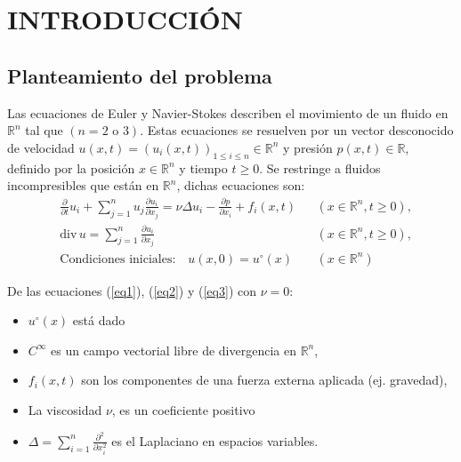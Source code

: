 \chapter{INTRODUCCIÓN}
\setcounter{page}{1}
\section{Planteamiento del problema}
Las ecuaciones de Euler y Navier-Stokes describen el movimiento de un fluido en $\mathbb{R}^n$ tal que $(n=2\text{ o }3)$. Estas ecuaciones se resuelven por un vector desconocido de velocidad $u(x,t)= \left(u_i(x,t)\right)_{1\leq i \leq n}\in \mathbb{R}^n$ y presión $p(x,t)\in \mathbb{R}$, definido por la posición $x\in \mathbb{R}^n$ y tiempo $t\geq 0$. Se restringe a fluidos incompresibles que están en $\mathbb{R}^n$, dichas ecuaciones son:
\begin{align}
    &\frac{\partial}{\partial t} u_i + \sum_{j = 1}^n u_j \frac{\partial u_i}{\partial x_j} = \nu \Delta u_i - \frac{\partial p}{\partial x_i} + f_i(x,t)&& \left(x\in \mathbb{R}^n, t\geq 0\right),\label{eq1}\\
    &\text{div}\, u = \sum_{j = 1}^n \frac{\partial u_i}{\partial x_j} && \left(x\in \mathbb{R}^n, t\geq 0\right),\label{eq2}\\
    &\text{Condiciones iniciales:}\quad u(x,0) = u^{\circ}(x) && \left(x\in \mathbb{R}^n\right)\label{eq3}
\end{align}
\begin{notation}
De las ecuaciones (\ref{eq1}), (\ref{eq2}) y (\ref{eq3}) con $\nu=0$:
    \begin{itemize}
        \item $u^{\circ}(x)$ está dado
        \item $C^{\infty}$  es un campo vectorial libre de divergencia en $\mathbb{R}^n$,
        \item $f_i(x,t)$ son los componentes de una fuerza externa aplicada (ej. gravedad),
        \item La viscosidad $\nu$, es un coeficiente positivo
        \item $\Delta = \sum_{i=1}^n \frac{\partial^2}{\partial x_i^2}$ es el Laplaciano en espacios variables.
    \end{itemize}    
\end{notation}
